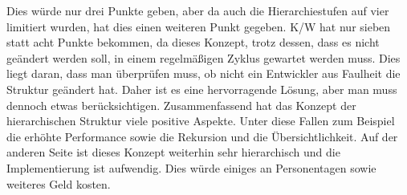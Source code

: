 Dies würde nur drei Punkte geben, aber da auch die Hierarchiestufen auf vier limitiert wurden, hat dies einen weiteren Punkt gegeben.
\ac{K/W} hat nur sieben statt acht Punkte bekommen, da dieses Konzept, trotz dessen, dass es nicht geändert werden soll, in einem regelmäßigen Zyklus gewartet werden muss.
Dies liegt daran, dass man überprüfen muss, ob nicht ein Entwickler aus Faulheit die Struktur geändert hat.
Daher ist es eine hervorragende Lösung, aber man muss dennoch etwas berücksichtigen.
\newline
\newline
Zusammenfassend hat das Konzept der hierarchischen Struktur viele positive Aspekte.
Unter diese Fallen zum Beispiel die erhöhte Performance sowie die Rekursion und die Übersichtlichkeit.
Auf der anderen Seite ist dieses Konzept weiterhin sehr hierarchisch und die Implementierung ist aufwendig.
Dies würde einiges an Personentagen sowie weiteres Geld kosten.

